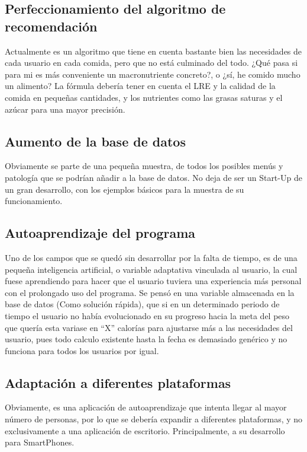 \subsection{Perfeccionamiento del algoritmo de recomendación}
Actualmente es un algoritmo que tiene en cuenta bastante bien las necesidades de cada usuario en cada comida, pero que no está culminado del todo. ¿Qué pasa si para mi es más conveniente un macronutriente concreto?, o ¿sí, he comido mucho un alimento? La fórmula debería tener en cuenta el LRE y la calidad de la comida en pequeñas cantidades, y los nutrientes como las grasas saturas y el azúcar para una mayor precisión.
\subsection{Aumento de la base de datos}
Obviamente se parte de una pequeña muestra, de todos los posibles menús y patología que se podrían añadir a la base de datos. No deja de ser un Start-Up de un gran desarrollo, con los ejemplos básicos para la muestra de su funcionamiento.
\subsection{Autoaprendizaje del programa}
Uno de los campos que se quedó sin desarrollar por la falta de tiempo, es de una pequeña inteligencia artificial, o variable adaptativa vinculada al usuario, la cual fuese aprendiendo para hacer que el usuario tuviera una experiencia más personal con el prolongado uso del programa.
Se pensó en una variable almacenada en la base de datos (Como solución rápida), que si en un determinado periodo de tiempo el usuario no había evolucionado en su progreso hacia la meta del peso que quería esta variase en “X” calorías para ajustarse más a las necesidades del usuario, pues todo calculo existente hasta la fecha es demasiado genérico y no funciona para todos los usuarios por igual.

\subsection{Adaptación a diferentes plataformas}
Obviamente, es una aplicación de autoaprendizaje que intenta llegar al mayor número de personas, por lo que se debería expandir a diferentes plataformas, y no exclusivamente a una aplicación de escritorio. Principalmente, a su desarrollo para SmartPhones.
